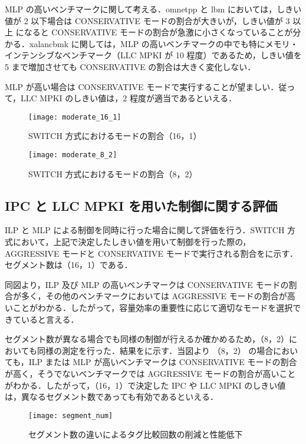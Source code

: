 MLP の高いベンチマークに関して考える．omnetpp と lbm においては，しきい値が 2 以下場合は CONSERVATIVE モードの割合が大きいが，しきい値が 3 以上 になると CONSERVATIVE モードの割合が急激に小さくなっていることが分かる．xalancbmk に関しては，MLP の高いベンチマークの中でも特にメモリ・インテンシブなベンチマーク（LLC MPKI が 10 程度）であるため，しきい値を 5 まで増加させても CONSERVATIVE の割合は大きく変化しない．

MLP が高い場合は CONSERVATIVE モードで実行することが望ましい．従って，LLC MPKI のしきい値は，2 程度が適当であるといえる．

\begin{figure}[htb]
  \centering
  \texttt{[image: moderate\_16\_1]}
  \caption{SWITCH 方式におけるモードの割合（16，1）}
  \label{fig:moderate_16_1}
\end{figure}

\begin{figure}[htb]
  \centering
  \texttt{[image: moderate\_8\_2]}
  \caption{SWITCH 方式におけるモードの割合（8，2）}
  \label{fig:moderate_8_2}
\end{figure}

\subsection{IPC と LLC MPKI を用いた制御に関する評価}
ILP と MLP による制御を同時に行った場合に関して評価を行う．SWITCH 方式において，上記で決定したしきい値を用いて制御を行った際の，AGGRESSIVE モードと CONSERVATIVE モードで実行される割合をに示す．セグメント数は（16，1）である．

同図より，ILP 及び MLP の高いベンチマークは CONSERVATIVE モードの割合が多く，その他のベンチマークにおいては AGGRESSIVE モードの割合が高いことがわかる．したがって，容量効率の重要性に応じて適切なモードを選択できていると言える．

セグメント数が異なる場合でも同様の制御が行えるか確かめるため，（8，2）においても同様の測定を行った．結果をに示す．当図より （8，2） の場合においても，ILP または MLP が高いベンチマークは CONSERVATIVE モードの割合が高く，そうでないベンチマークでは AGGRESSIVE モードの割合が高いことがわかる．したがって，（16，1）で決定した IPC や LLC MPKI のしきい値は，異なるセグメント数であっても有効であるといえる．


\begin{figure}[htb]
  \centering
  \texttt{[image: segment\_num]}
  \caption{セグメント数の違いによるタグ比較回数の削減と性能低下}
  \label{fig:segment_num}
\end{figure}

